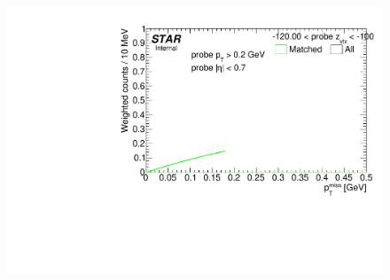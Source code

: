 \begin{figure}[h!]
{  \includegraphics[width=\linewidth,page=10]{graphics/correctionsToEff/TOF_tagAndProbe/Fitting_effVsZVtx_mc.CPT2.pdf}
}
\end{figure}
%
%
%
%

%
%
%
%
%
%
%
%
%

